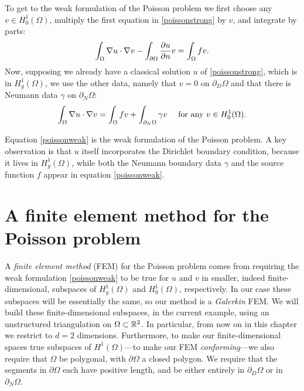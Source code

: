 To get to the weak formulation of the Poisson problem we first choose any $v\in H_0^1(\Omega)$, multiply the first equation in \eqref{poissonstrong} by $v$, and integrate by parts:
\begin{equation*}
\int_\Omega \nabla u \cdot \nabla v - \int_{\partial\Omega} \frac{\partial u}{\partial n} v = \int_\Omega f v.
\end{equation*}
Now, supposing we already have a classical solution $u$ of \eqref{poissonstrong}, which is in $H_g^1(\Omega)$, we use the other data, namely that $v=0$ on $\partial_D\Omega$ and that there is Neumann data $\gamma$ on $\partial_N\Omega$:
\begin{equation}
\int_\Omega \nabla u \cdot \nabla v = \int_\Omega f v + \int_{\partial_N\Omega} \gamma v\quad \text{ for any } v\in H_0^1(\Omega). \label{poissonweak}
\end{equation}

Equation \eqref{poissonweak} is the weak formulation of the Poisson problem.  A key observation is that $u$ itself incorporates the Dirichlet boundary condition, because it lives in $H_g^1(\Omega)$, while both the Neumann boundary data $\gamma$ and the source function $f$ appear in equation \eqref{poissonweak}.


\section{A finite element method for the Poisson problem}

A \emph{finite element method} (FEM) for the Poisson problem comes from requiring the weak formulation \eqref{poissonweak} to be true for $u$ and $v$ in smaller, indeed finite-dimensional, subspaces of $H_g^1(\Omega)$ and $H_0^1(\Omega)$, respectively.  In our case these subspaces will be essentially the same, so our method is a \emph{Galerkin} FEM.  We will build these finite-dimensional subspaces, in the current example, using an unstructured triangulation on $\Omega\subset \mathbb{R}^2$.  In particular, from now on in this chapter we restrict to $d=2$ dimensions.  Furthermore, to make our finite-dimensional spaces true subspaces of $H^1(\Omega)$---to make our FEM \emph{conforming}---we also require that $\Omega$ be polygonal, with $\partial\Omega$ a closed polygon.  We require that the segments in $\partial\Omega$ each have positive length, and be either entirely in $\partial_D\Omega$ or in $\partial_N\Omega$.

